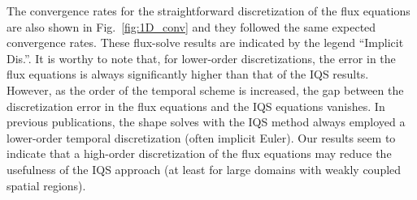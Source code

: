 \documentclass{elsarticle}
\newcommand{\fig}[1]{Fig.~\ref{#1}}                      %
\begin{document}
The convergence rates for the straightforward discretization of the flux equations are also shown in \fig{fig:1D_conv} and they followed the same expected convergence rates. These flux-solve results are indicated by the legend ``Implicit Dis.''. It is worthy to note that, for lower-order discretizations, the error in the flux equations is always significantly higher than that of the IQS results. However, as the order of the temporal scheme is increased, the gap between the discretization error in the flux equations and the IQS equations vanishes. In previous publications, the shape solves with the IQS method always employed a lower-order temporal discretization (often implicit Euler). Our results seem to indicate that a high-order discretization of the flux equations may reduce the usefulness of the IQS approach (at least for large domains with weakly coupled spatial regions).
\end{document}
